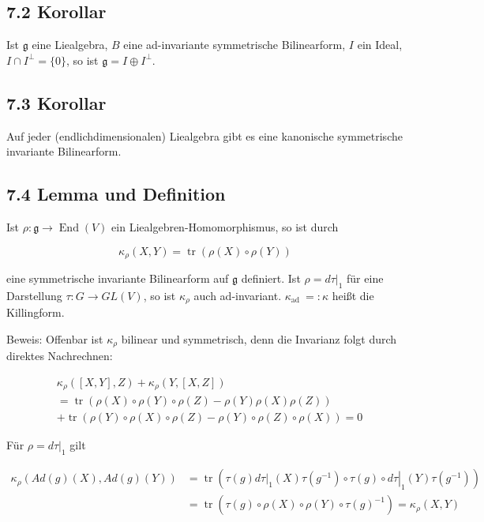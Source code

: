 \documentclass[10pt, letterpaper]{article}
\begin{document}
\subsection*{7.2 Korollar}
Ist $\mathfrak{g}$ eine Liealgebra, $B$ eine ad-invariante symmetrische Bilinearform, $I$ ein Ideal, $I \cap I^{\perp}=\{0\}$, so ist $\mathfrak{g}=I \oplus I^{\perp}$.

\subsection*{7.3 Korollar}
Auf jeder (endlichdimensionalen) Liealgebra gibt es eine kanonische symmetrische invariante Bilinearform.

\subsection*{7.4 Lemma und Definition}
Ist $\rho: \mathfrak{g} \rightarrow \operatorname{End}(V)$ ein Liealgebren-Homomorphismus, so ist durch

$$
\kappa_{\rho}(X, Y)=\operatorname{tr}(\rho(X) \circ \rho(Y))
$$

eine symmetrische invariante Bilinearform auf $\mathfrak{g}$ definiert. Ist $\rho=\left.d \tau\right|_{1}$ für eine Darstellung $\tau: G \rightarrow G L(V)$, so ist $\kappa_{\rho}$ auch ad-invariant. $\kappa_{\text {ad }}=: \kappa$ heißt die Killingform.

Beweis: Offenbar ist $\kappa_{\rho}$ bilinear und symmetrisch, denn die Invarianz folgt durch direktes Nachrechnen:

$$
\begin{aligned}
& \kappa_{\rho}([X, Y], Z)+\kappa_{\rho}(Y,[X, Z]) \\
& =\operatorname{tr}(\rho(X) \circ \rho(Y) \circ \rho(Z)-\rho(Y) \rho(X) \rho(Z)) \\
& +\operatorname{tr}(\rho(Y) \circ \rho(X) \circ \rho(Z)-\rho(Y) \circ \rho(Z) \circ \rho(X))=0
\end{aligned}
$$

Für $\rho=\left.d \tau\right|_{1}$ gilt

$$
\begin{aligned}
\kappa_{\rho}(A d(g)(X), A d(g)(Y)) & =\operatorname{tr}\left(\left.\left.\tau(g) d \tau\right|_{1}(X) \tau\left(g^{-1}\right) \circ \tau(g) \circ d \tau\right|_{1}(Y) \tau\left(g^{-1}\right)\right) \\
& =\operatorname{tr}\left(\tau(g) \circ \rho(X) \circ \rho(Y) \circ \tau(g)^{-1}\right)=\kappa_{\rho}(X, Y)
\end{aligned}
$$
\end{document}
